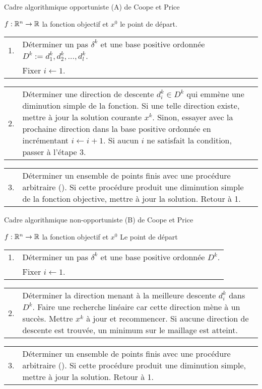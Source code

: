 \begin{algorithm}[H]
	\label{alg:Acoope}
	\caption{\textsf{Cadre algorithmique opportuniste (A) de Coope et Price}}
	\label{A}
	\begin{algorithmic}
	\STATE $f:\mathbb{R}^n\rightarrow \mathbb{R}$ la fonction objectif et $x^0$ le point de départ.
	\STATE \begin{tabularx}{440pt}{l X}1. & Déterminer un pas $\delta ^k$ et une base positive ordonnée $D^k:={d_1^k,d_2^k,\dots,d^k_l}$.\\ ~ & Fixer $i \leftarrow 1$.\end{tabularx}
	\STATE \begin{tabularx}{440pt}{l X}2. & Déterminer une direction de descente $d_i^k\in D^k$ qui emmène une diminution simple de la fonction. Si une telle direction existe, mettre à jour la solution courante $x^k$. Sinon, essayer avec la prochaine direction dans la base positive ordonnée en incrémentant $i\leftarrow i+1$. Si aucun $i$ ne satisfait la condition, passer à l'étape 3.\end{tabularx}
	\STATE \begin{tabularx}{440pt}{l X}3. & Déterminer un ensemble de points finis avec une procédure arbitraire (\SEARCH). Si cette procédure produit une diminution simple de la fonction objective, mettre à jour la solution. Retour à 1.\end{tabularx}
	\end{algorithmic}
\end{algorithm}
\begin{algorithm}[H]
	\caption{\textsf{Cadre algorithmique non-opportuniste (B) de Coope et Price}}
	\label{alg:BCoope}
\begin{algorithmic}
	\STATE $f:\mathbb{R}^n\rightarrow \mathbb{R}$ la fonction objectif et $x^0$ Le point de départ 
	\STATE  \begin{tabularx}{440pt}{l X}
		1. & Déterminer un pas $\delta ^k$ et une base positive ordonnée $D^k$.\\
			 ~ & Fixer $i \leftarrow 1$.
		\end{tabularx}
	\STATE \begin{tabularx}{440pt}{l X}
		2. & Déterminer la direction menant à la meilleure descente $d_i^k$ dans $D^k$. Faire une recherche linéaire car cette direction mène à un succès. Mettre $x^k$ à jour et recommencer. Si aucune direction de descente est trouvée, un minimum sur le maillage est atteint.
	\end{tabularx}
		\STATE \begin{tabularx}{440pt}{l X}3. & Déterminer un ensemble de points finis avec une procédure arbitraire (\SEARCH). Si cette procédure produit une diminution simple, mettre à jour la solution. Retour à 1.
		\end{tabularx}
\end{algorithmic}
\end{algorithm}
